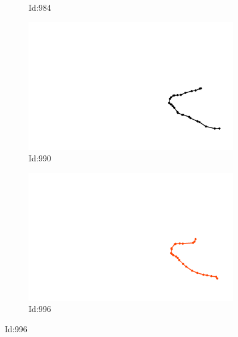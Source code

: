 \documentclass[12pt,twoside]{report}
\begin{document}
\begin{figure}
\begin{subfigure}[b]{0.20\textwidth}
\caption{Id:984}
\end{subfigure}
\begin{subfigure}[b]{0.20\textwidth}
\centering
\includegraphics[width=\textwidth]{../../trajectories/990.png}
\caption{Id:990}
\end{subfigure}
\begin{subfigure}[b]{0.20\textwidth}
\centering
\includegraphics[width=\textwidth]{../../trajectories/996.png}
\caption{Id:996}
\end{subfigure}
\end{figure}
\end{document}

